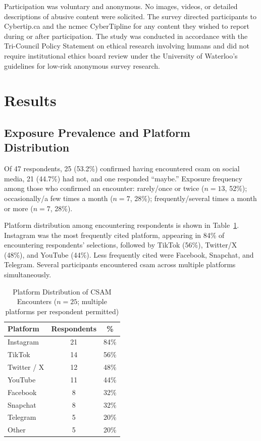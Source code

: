 \documentclass{ieee-portfolio}
\begin{document}
Participation was voluntary and anonymous. No images, videos, or detailed descriptions of abusive content were solicited. The survey directed participants to Cybertip.ca and the \gls{ncmec} CyberTipline for any content they wished to report during or after participation. The study was conducted in accordance with the Tri-Council Policy Statement on ethical research involving humans and did not require institutional ethics board review under the University of Waterloo's guidelines for low-risk anonymous survey research.
 
\section{Results}
 
\subsection{Exposure Prevalence and Platform Distribution}
 
Of 47 respondents, 25 (53.2\%) confirmed having encountered \gls{csam} on social media, 21 (44.7\%) had not, and one responded ``maybe.'' Exposure frequency among those who confirmed an encounter: rarely/once or twice ($n = 13$, 52\%); occasionally/a few times a month ($n = 7$, 28\%); frequently/several times a month or more ($n = 7$, 28\%).
 
Platform distribution among encountering respondents is shown in Table~\ref{tab:platforms}. Instagram was the most frequently cited platform, appearing in 84\% of encountering respondents' selections, followed by TikTok (56\%), Twitter/X (48\%), and YouTube (44\%). Less frequently cited were Facebook, Snapchat, and Telegram. Several participants encountered \gls{csam} across multiple platforms simultaneously.
 
\begin{table}[!ht]
\centering
\caption{Platform Distribution of CSAM Encounters ($n = 25$; multiple platforms per respondent permitted)}
\label{tab:platforms}
\renewcommand{\arraystretch}{1.2}
\begin{tabular}{lcc}
\toprule
\textbf{Platform} & \textbf{Respondents} & \textbf{\%} \\
\midrule
Instagram   & 21 & 84\% \\
TikTok      & 14 & 56\% \\
Twitter / X & 12 & 48\% \\
YouTube     & 11 & 44\% \\
Facebook    & 8  & 32\% \\
Snapchat    & 8  & 32\% \\
Telegram    & 5  & 20\% \\
Other       & 5  & 20\% \\
\bottomrule
\end{tabular}
\end{table}
 
\end{document}
